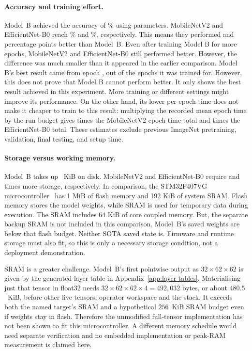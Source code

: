 \paragraph{Accuracy and training effort.}
Model~B achieved the accuracy of \FinalBAccuracy\% using \FinalBParams{} parameters.
MobileNetV2 and EfficientNet-B0 reach \FinalMobileAccuracy\% and
\FinalEfficientAccuracy\%, respectively. This means they performed \FinalMobileGap{} and
\FinalEfficientGap{} percentage points better than Model~B. Even after training Model B 
for more epochs, MobileNetV2 and EfficientNet-B0 still performed better. However, the 
difference was much smaller than it appeared in the earlier comparison. Model B's best 
result came from epoch \FinalBSelectedEpoch{}, out of the \FinalBEpochs{} epochs it was
trained for.
However, this does not prove that Model B cannot perform better. It only shows the 
best result achieved in this experiment. More training or different settings 
might improve its performance.
On the other hand, its lower per-epoch time does
not make it cheaper to train to this result: multiplying the recorded mean
epoch time by the run budget gives \FinalMobileTrainingRatio{} times the
MobileNetV2 epoch-time total and \FinalEfficientTrainingRatio{} times the
EfficientNet-B0 total. These estimates exclude previous ImageNet pretraining, 
validation, final testing, and setup time.

\paragraph{Storage versus working memory.}
Model~B takes up \FinalBSize{}~KiB on disk. MobileNetV2 and EfficientNet-B0
require \FinalMobileStorageRatio{} and \FinalEfficientStorageRatio{} times
more storage, respectively. In comparison, the STM32F407VG microcontroller~\cite{st2026stm32f407vg}
has 1 MiB of flash memory and 192 KiB of system SRAM. Flash memory stores 
the model weights, while SRAM is used for temporary data during execution. 
The SRAM includes 64 KiB of core coupled memory. But, the separate backup SRAM 
is not included in this comparison.
Model~B's saved weights are below that flash budget. Neither SOTA saved state
is. Firmware and runtime storage must also fit, so this is only a necessary
storage condition, not a deployment demonstration.

SRAM is a greater challenge. Model~B's first pointwise output as
$32\times62\times62$ is given by the generated layer table in
Appendix~\ref{app:layer-tables}. Materialising just that tensor in float32 needs
$32\times62\times62\times4=492{,}032$ bytes, or about $480.5$~KiB, before
other live tensors, operator workspace and the stack. It exceeds both the
named target's SRAM and a hypothetical $256$~KiB SRAM budget even if weights
stay in flash. Therefore the unmodified full-tensor implementation has not been
shown to fit this microcontroller. A different memory schedule would need
separate verification and no embedded implementation or peak-RAM measurement
is claimed here.

